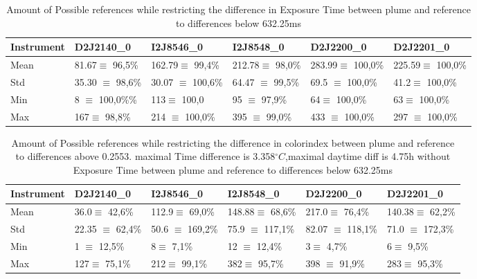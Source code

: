 \documentclass  [
  paper    = a4,
  BCOR     = 10mm,
  twoside,
  fontsize = 12pt,
  fleqn,
  toc      = bibnumbered,
  toc      = listofnumbered,
  numbers  = noendperiod,
  headings = normal,
  listof   = leveldown,
  version  = 3.03
]                                       {scrreprt}
\begin{document}
	\begin{table}
	\begin{tabular}{|p{2cm}|p{2cm}|p{2cm}|p{2cm}|p{2cm}|p{2cm}|}
		Instrument	&D2J2140\_0&I2J8546\_0& I2J8548\_0&D2J2200\_0&D2J2201\_0\\
		\toprule
		Mean&
		81.67$\equiv$ 96,5\%		&162.79$\equiv$ 99,4\%		&212.78$\equiv$ 98,0\%		&283.99$\equiv$ 100,0\%		&225.59$\equiv$ 100,0\% \\
		\midrule
		Std&
		35.30 $\equiv$	98,6\%&		30.07 $\equiv$	100,6\%&
		64.47 $\equiv$	99,5\% &		69.5 $\equiv$	100,0\% &
		41.2$\equiv$	100,0\% \\
		\midrule
		Min  &
		8 $\equiv$	100,0\%\%&113$\equiv$	100,0
		&95 $\equiv$	97,9\%
		&64$\equiv$	100,0\%
		&63$\equiv$	100,0\%\\
		\midrule
		Max&
		167$\equiv$	98,8\% &
		214 $\equiv$	100,0\% &
		395 $\equiv$	99,0\% &
		433 $\equiv$	100,0\%  &
		297 $\equiv$	100,0\% \\
		\bottomrule
	\end{tabular}
	\caption{Amount of Possible references while restricting the difference in Exposure Time  between plume and reference to differences below 632.25ms}
	\label{tab:etrest}
\end{table}	







	\begin{table}
\begin{tabular}{|p{2cm}|p{2cm}|p{2cm}|p{2cm}|p{2cm}|p{2cm}|}
	Instrument	&D2J2140\_0&I2J8546\_0& I2J8548\_0&D2J2200\_0&D2J2201\_0\\
	\toprule
	Mean&
	36.0$\equiv$ 42,6\%&	112.9$\equiv$ 69,0\%&
	148.88$\equiv$ 68,6\%&	217.0$\equiv$ 76,4\%&	140.38$\equiv$ 62,2\%\\
	\midrule
	Std&
	22.35 $\equiv$	62,4\%&
	50.6 $\equiv$	169,2\% &
	75.9 $\equiv$	117,1\%&
	82.07 $\equiv$	118,1\% &
	71.0 $\equiv$	172,3\% \\
	\midrule
	Min&
	1 $\equiv$	    12,5\%  &
	8$\equiv$	7,1\%  &
	12 $\equiv$	12,4\%  &
	3$\equiv$	4,7\%   &
	6$\equiv$	9,5\%  \\
	\midrule
	Max
	&127$\equiv$	75,1\%
	&212$\equiv$	99,1\%
	&382$\equiv$	95,7\%
	&398 $\equiv$	91,9\%
	&283$\equiv$	95,3\%\\
	\bottomrule
\end{tabular}
\caption{Amount of Possible references while restricting the difference in colorindex  between plume and reference to differences above 0.2553. maximal Time difference is 3.358$^{\circ}C$,maximal daytime diff is 4.75h without Exposure Time  between plume and reference to differences below 632.25ms}
\end{table}	
\end{document}
